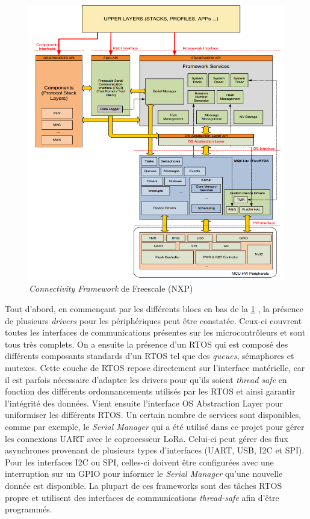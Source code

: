 \begin{figure}[ht!]
    \centering
    \includegraphics[width=1.0\textwidth]{Figures/Software/freescale_osa_framework.PNG}
    \caption{\textit{Connectivity Framework} de Freescale (NXP)}
    \label{fig-freescale_osa_framework}
\end{figure}

Tout d'abord, en commençant par les différents blocs en bas de la \cref{fig-freescale_osa_framework} , la présence de plusieurs \textit{drivers} pour les périphériques peut être constatée. Ceux-ci couvrent toutes les interfaces de communications présentes sur les microcontrôleurs et sont tous très complets. On a ensuite la présence d'un RTOS qui est composé des différents composants standards d'un RTOS tel que des \textit{queues}, sémaphores et mutexes. Cette couche de RTOS repose directement sur l'interface matérielle, car il est parfois nécessaire d'adapter les drivers pour qu'ils soient \textit{thread safe} en fonction des différents ordonnancements utilisés par les RTOS et ainsi garantir l'intégrité des données. Vient ensuite l'interface OS Abstraction Layer pour uniformiser les différents RTOS. Un certain nombre de services sont disponibles, comme par exemple, le \textit{Serial Manager} qui a été utilisé dans ce projet pour gérer les connexions UART avec le coprocesseur LoRa. Celui-ci peut gérer des flux asynchrones provenant de plusieurs types d'interfaces (UART, USB, I2C et SPI). Pour les interfaces I2C ou SPI, celles-ci doivent être configurées avec une interruption sur un GPIO pour informer le \textit{Serial Manager }qu'une nouvelle donnée est disponible. La plupart de ces frameworks sont des tâches RTOS propre et utilisent des interfaces de communications \textit{thread-safe} afin d'être programmés.  \\

